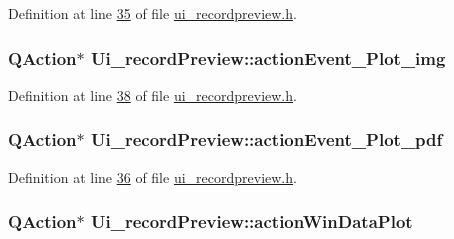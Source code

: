 Definition at line \hyperlink{a00053_source_l00035}{35} of file \hyperlink{a00053_source}{ui\+\_\+recordpreview.\+h}.

\hypertarget{a00028_a789f5466c7f1781c13d4d027e982ca55}{
\subsubsection[{action\+Event\+\_\+\+Plot\+\_\+img}]{\setlength{\rightskip}{0pt plus 5cm}Q\+Action$\ast$ Ui\+\_\+record\+Preview\+::action\+Event\+\_\+\+Plot\+\_\+img}}\label{a00028_a789f5466c7f1781c13d4d027e982ca55}


Definition at line \hyperlink{a00053_source_l00038}{38} of file \hyperlink{a00053_source}{ui\+\_\+recordpreview.\+h}.

\hypertarget{a00028_a4369770edbf9cb6131a066ca10b3f863}{
\subsubsection[{action\+Event\+\_\+\+Plot\+\_\+pdf}]{\setlength{\rightskip}{0pt plus 5cm}Q\+Action$\ast$ Ui\+\_\+record\+Preview\+::action\+Event\+\_\+\+Plot\+\_\+pdf}}\label{a00028_a4369770edbf9cb6131a066ca10b3f863}


Definition at line \hyperlink{a00053_source_l00036}{36} of file \hyperlink{a00053_source}{ui\+\_\+recordpreview.\+h}.

\hypertarget{a00028_aa09067a9c96c9cd78f75261a9fcb89f0}{
\subsubsection[{action\+Win\+Data\+Plot}]{\setlength{\rightskip}{0pt plus 5cm}Q\+Action$\ast$ Ui\+\_\+record\+Preview\+::action\+Win\+Data\+Plot}}\label{a00028_aa09067a9c96c9cd78f75261a9fcb89f0}


